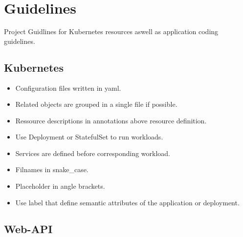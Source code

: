 \chapter{Guidelines}
Project Guidlines for Kubernetes resources aswell as application coding guidelines.

\section{Kubernetes}
\begin{itemize}
    \item Configuration files written in yaml.
    \item Related objects are grouped in a single file if possible.
    \item Ressource descriptions in annotations above resource definition.
    \item Use Deployment or StatefulSet to run workloads.
    \item Services are defined before corresponding workload.
    \item Filnames in snake\_case.
    \item Placeholder in angle brackets.
    \item Use label that define semantic attributes of the application or deployment.
\end{itemize}

\section{Web-API}
